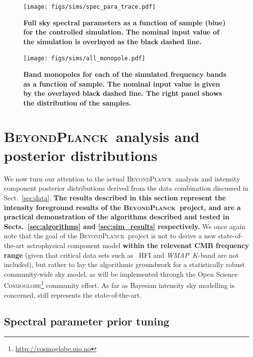 \documentclass[twocolumn]{aa}
\def\WMAP{\emph{WMAP}}
\newcommand{\BP}{\textsc{BeyondPlanck}}
\begin{document}
\begin{figure}
\texttt{[image: figs/sims/spec\_para\_trace.pdf]}
\caption{\textbf{Full sky spectral parameters as a function of sample (blue) for the controlled simulation. The nominal input value of the simulation is overlayed as the black dashed line.}}
\label{fig:simulated_indices}
\end{figure}

\begin{figure}
\texttt{[image: figs/sims/all\_monopole.pdf]}
\caption{\textbf{Band monopoles for each of the simulated frequency bands as a function of sample. The nominal input value is given by the overlayed black dashed line. The right panel shows the distribution of the samples.}}
\label{fig:simulated_monopoles}
\end{figure}



\section{\BP\ analysis and posterior distributions}
\label{sec:results}

We now turn our attention to the actual \BP\ analysis and intensity
component posterior distributions derived from the data combination
discussed in Sect.~\ref{sec:data}.
\textbf{The results described in this section represent the 
intensity foreground results of the \BP\ project, and are a practical 
demonstration of the algorithms described and tested in Sects.~\ref{sec:algorithms} and \ref{sec:sim_results} respectively.} We once again note that the
goal of the \BP\ project is not to derive a new state-of-the-art
astrophysical component model \textbf{within the relevenat CMB frequency range} (given that critical data sets such as
\Planck\ HFI and \WMAP\ $K$-band are not included), but rather to lay
the algorithmic groundwork for a statistically robust community-wide
sky model, as will be implemented through the Open Science
\textsc{Cosmoglobe}\footnote{\url{http://cosmoglobe.uio.no}} community
effort. As far as Bayesian intensity sky modelling is concerned,
\citet{planck2014-a12} still represents the state-of-the-art.

\subsection{Spectral parameter prior tuning} %
\label{subsec:regions}
\end{document}
